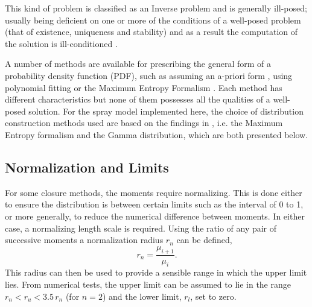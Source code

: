 \documentclass[a4paper,10pt]{article}
\begin{document}
This kind of problem is classified as an Inverse problem and is generally ill-posed; usually being deficient on one or more of the conditions of a well-posed problem (that of existence, uniqueness and stability) and as a result the computation of the solution is ill-conditioned \cite{john2007}.

A number of methods are available for prescribing the general form of a probability density function (PDF), such as assuming an a-priori form \cite{yue2004,john2007}, using polynomial fitting \cite{john2007,talenti1987} or the Maximum Entropy Formalism \cite{ahmadi1993,woodbury2004}.  Each method has different characteristics but none of them possesses all the qualities of a well-posed solution. For the spray model implemented here, the choice of distribution construction methods used are based on the findings in \cite{jones2011}, i.e. the Maximum Entropy formalism and the Gamma distribution, which are both presented below.%




\subsection{Normalization and Limits}
For some closure methods, the moments require normalizing.  This is done either to ensure the distribution is between certain limits such as the interval of 0 to 1, or more generally, to reduce the numerical difference between moments. In either case, a normalizing length scale is required.  Using the ratio of any pair of successive moments a normalization radius $r_n$ can be defined,
\begin{equation}
r_n = \frac{\mu_{i+1}}{\mu_{i}}.
\end{equation}
This radius can then be used to provide a sensible range in which the upper limit lies.  From numerical tests, the upper limit can be assumed to lie in the range $r_n < r_u < 3.5\, r_n$ (for $n=2$) and the lower limit, $r_l$, set to zero.
\end{document}
